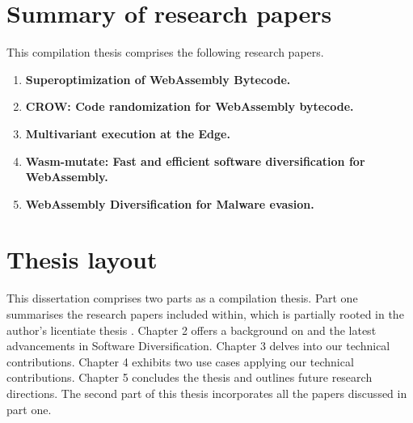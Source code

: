 \section{Summary of research papers}

This compilation thesis comprises the following research papers.

\begin{enumerate}[label={\textbf{P\arabic*}:}, ref={P\arabic*}]
	\item \label{superoptimizerpaper} \textbf{Superoptimization of WebAssembly Bytecode.} \\ 
	 \lipsum[1]
	\item \label{crowpaper} \textbf{CROW: Code randomization for WebAssembly bytecode.} \\ 
	 \lipsum[1]
	\item \label{mewepaper} \textbf{Multivariant execution at the Edge. } \\ 
	 \lipsum[1]
	\item \label{wasmmutatepaper} \textbf{ Wasm-mutate: Fast and efficient software diversification for WebAssembly. }\\ 
	 \lipsum[1]
	\item \label{evasionpaper} \textbf{WebAssembly Diversification for Malware evasion.} \\ 
	 \lipsum[1]
 
\end{enumerate}



\section*{Thesis layout}
This dissertation comprises two parts as a compilation thesis. 
Part one summarises the research papers included within, which is partially rooted in the author's licentiate thesis \cite{Lic}. 
Chapter 2 offers a background on \Wasm and the latest advancements in Software Diversification. 
Chapter 3 delves into our technical contributions. 
Chapter 4 exhibits two use cases applying our technical contributions. 
Chapter 5 concludes the thesis and outlines future research directions. 
The second part of this thesis incorporates all the papers discussed in part one.

